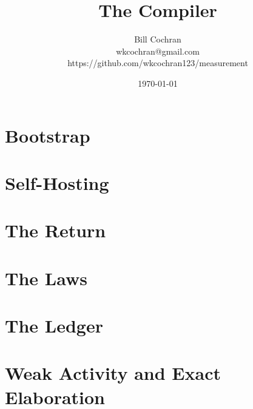 \documentclass[12pt,oneside]{book}
\begin{document}
\title{The Compiler}
\author{Bill Cochran\\wkcochran@gmail.com\\https://github.com/wkcochran123/measurement}
\date{\today}
\maketitle

\frontmatter
\onehalfspacing
\tableofcontents

\mainmatter
\part{Bootstrap}





\part{Self-Hosting}



\part{The Return}







\part{The Laws}




\part{The Ledger}



\part{Weak Activity and Exact Elaboration}






\backmatter
\end{document}
